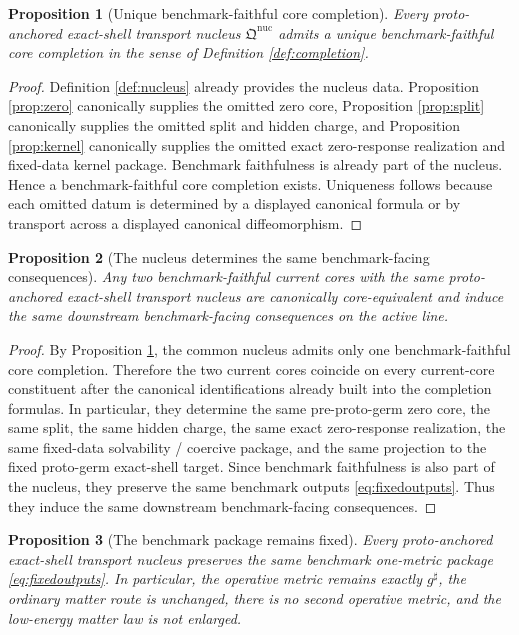 \documentclass[11pt]{article}
\newcommand{\CompletedMetric}{g^{\sharp}}
\newcommand{\PreProtoNucleus}{\mathfrak Q^{\mathrm{nuc}}}
\newtheorem{proposition}{Proposition}
\begin{document}
\begin{proposition}[Unique benchmark-faithful core completion]
\label{prop:completion}
Every proto-anchored exact-shell transport nucleus \(\PreProtoNucleus\) admits a unique benchmark-faithful core completion in the sense of Definition \ref{def:completion}.
\end{proposition}

\begin{proof}
Definition \ref{def:nucleus} already provides the nucleus data. Proposition \ref{prop:zero} canonically supplies the omitted zero core, Proposition \ref{prop:split} canonically supplies the omitted split and hidden charge, and Proposition \ref{prop:kernel} canonically supplies the omitted exact zero-response realization and fixed-data kernel package. Benchmark faithfulness is already part of the nucleus. Hence a benchmark-faithful core completion exists. Uniqueness follows because each omitted datum is determined by a displayed canonical formula or by transport across a displayed canonical diffeomorphism.
\end{proof}

\begin{proposition}[The nucleus determines the same benchmark-facing consequences]
\label{prop:frontier}
Any two benchmark-faithful current cores with the same proto-anchored exact-shell transport nucleus are canonically core-equivalent and induce the same downstream benchmark-facing consequences on the active line.
\end{proposition}

\begin{proof}
By Proposition \ref{prop:completion}, the common nucleus admits only one benchmark-faithful core completion. Therefore the two current cores coincide on every current-core constituent after the canonical identifications already built into the completion formulas. In particular, they determine the same pre-proto-germ zero core, the same split, the same hidden charge, the same exact zero-response realization, the same fixed-data solvability / coercive package, and the same projection to the fixed proto-germ exact-shell target. Since benchmark faithfulness is also part of the nucleus, they preserve the same benchmark outputs \eqref{eq:fixedoutputs}. Thus they induce the same downstream benchmark-facing consequences.
\end{proof}

\begin{proposition}[The benchmark package remains fixed]
\label{prop:benchmark}
Every proto-anchored exact-shell transport nucleus preserves the same benchmark one-metric package \eqref{eq:fixedoutputs}. In particular, the operative metric remains exactly \(\CompletedMetric\), the ordinary matter route is unchanged, there is no second operative metric, and the low-energy matter law is not enlarged.
\end{proposition}
\end{document}

